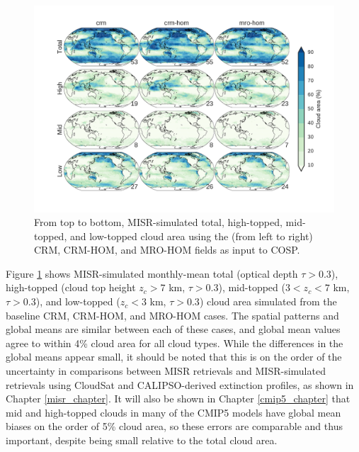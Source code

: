 \begin{figure}
\centering
\includegraphics[width=\columnwidth]{graphics/subgrid1_cldmisr_maps.pdf}
\caption{From top to bottom, MISR-simulated total, high-topped, mid-topped, and low-topped cloud area using the (from left to right) CRM, CRM-HOM, and MRO-HOM fields as input to COSP.}
\label{sg_cldmisr_maps}
\end{figure}

Figure \ref{sg_cldmisr_maps} shows MISR-simulated monthly-mean total (optical depth $\tau > 0.3$), high-topped (cloud top height $z_c > 7$ km, $\tau > 0.3$), mid-topped ($3 < z_c < 7$ km, $\tau > 0.3$), and low-topped ($z_c < 3$ km, $\tau > 0.3$) cloud area simulated from the baseline CRM, CRM-HOM, and MRO-HOM cases. The spatial patterns and global means are similar between each of these cases, and global mean values agree to within 4\% cloud area for all cloud types. While the differences in the global means appear small, it should be noted that this is on the order of the uncertainty in comparisons between MISR retrievals and MISR-simulated retrievals using CloudSat and CALIPSO-derived extinction profiles, as shown in Chapter \ref{misr_chapter}. It will also be shown in Chapter \ref{cmip5_chapter} that mid and high-topped clouds in many of the CMIP5 models have global mean biases on the order of 5\% cloud area, so these errors are comparable and thus important, despite being small relative to the total cloud area.

